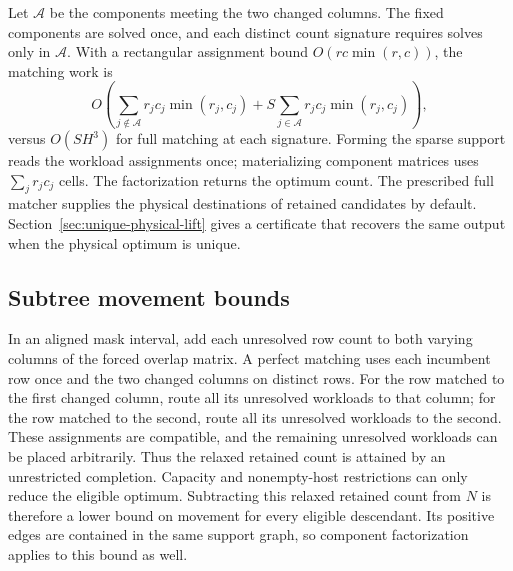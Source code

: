 \documentclass[11pt]{article}
\begin{document}
Let $\mathcal A$ be the components meeting the two changed columns. The fixed components are solved once, and each distinct count signature requires solves only in $\mathcal A$. With a rectangular assignment bound $O(rc\min(r,c))$, the matching work is
\begin{equation}
O\!\left(\sum_{j\notin\mathcal A}r_jc_j\min(r_j,c_j)
+S\sum_{j\in\mathcal A}r_jc_j\min(r_j,c_j)\right),
\label{eq:component-work}
\end{equation}
versus $O(SH^3)$ for full matching at each signature. Forming the sparse support reads the workload assignments once; materializing component matrices uses $\sum_jr_jc_j$ cells. The factorization returns the optimum count. The prescribed full matcher supplies the physical destinations of retained candidates by default. Section~\ref{sec:unique-physical-lift} gives a certificate that recovers the same output when the physical optimum is unique.

\subsection{Subtree movement bounds}
In an aligned mask interval, add each unresolved row count to both varying columns of the forced overlap matrix. A perfect matching uses each incumbent row once and the two changed columns on distinct rows. For the row matched to the first changed column, route all its unresolved workloads to that column; for the row matched to the second, route all its unresolved workloads to the second. These assignments are compatible, and the remaining unresolved workloads can be placed arbitrarily. Thus the relaxed retained count is attained by an unrestricted completion. Capacity and nonempty-host restrictions can only reduce the eligible optimum. Subtracting this relaxed retained count from $N$ is therefore a lower bound on movement for every eligible descendant. Its positive edges are contained in the same support graph, so component factorization applies to this bound as well.
\end{document}

